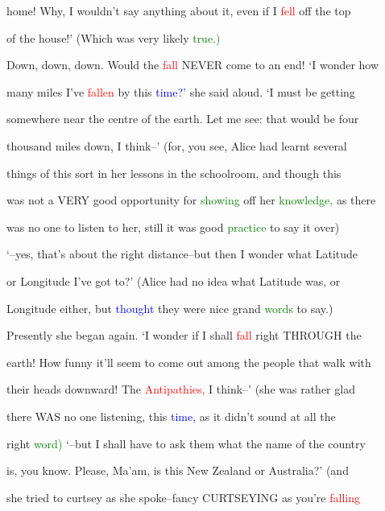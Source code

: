  home! Why, I wouldn’t say anything about it, even if I \textcolor{red}{fell} off the \textcolor{BurntOrange}{top}

 of the house!’ (Which was very likely \textcolor{green}{true.)}



 Down, down, down. Would the \textcolor{red}{fall} NEVER come to an end! ‘I wonder how

 many miles I’ve \textcolor{red}{fallen} by this \textcolor{blue}{time?’} she said aloud. ‘I must be getting

 somewhere near the centre of the earth. Let me see: that would be four

 thousand miles down, I think--’ (for, you see, Alice had learnt several

 things of this sort in her \textcolor{BurntOrange}{lessons} in the schoolroom, and though this

 was not a VERY \textcolor{BurntOrange}{good} \textcolor{BurntOrange}{opportunity} for \textcolor{green}{showing} off her \textcolor{green}{knowledge,} as there

 was no one to listen to her, still it was \textcolor{BurntOrange}{good} \textcolor{green}{practice} to say it over)

 ‘--yes, that’s about the right distance--but then I wonder what Latitude

 or Longitude I’ve got to?’ (Alice had no idea what Latitude was, or

 Longitude either, but \textcolor{blue}{thought} they were nice grand \textcolor{green}{words} to say.)



 Presently she began again. ‘I wonder if I shall \textcolor{red}{fall} right THROUGH the

 earth! How funny it’ll seem to come out among the people that walk with

 their heads downward! The \textcolor{red}{Antipathies,} I think--’ (she was rather \textcolor{BurntOrange}{glad}

 there WAS no one listening, this \textcolor{blue}{time,} as it didn’t sound at all the

 right \textcolor{green}{word)} ‘--but I shall have to ask them what the name of the country

 is, you know. Please, Ma’am, is this New Zealand or Australia?’ (and

 she tried to curtsey as she spoke--fancy CURTSEYING as you’re \textcolor{red}{falling}

